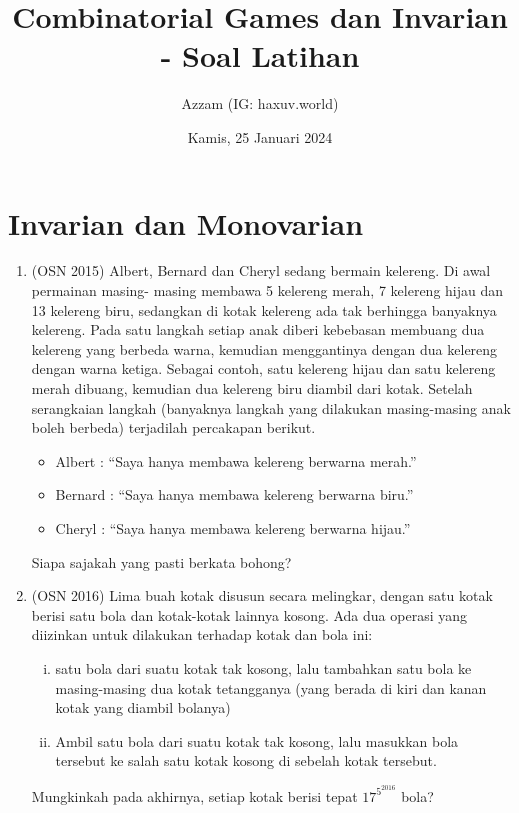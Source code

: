 \documentclass[12pt]{scrartcl}
\title{Combinatorial Games dan Invarian - Soal Latihan}
\author{Azzam (IG: haxuv.world)}
\date{Kamis, 25 Januari 2024}
\begin{document}
\maketitle

\renewcommand*\contentsname{Daftar Isi}
\tableofcontents

\newpage
\section{Invarian dan Monovarian}
\begin{enumerate}
\item (OSN 2015) Albert, Bernard dan Cheryl sedang bermain kelereng. Di awal permainan masing- masing membawa 5 kelereng merah, 7 kelereng hijau dan 13 kelereng biru, sedangkan di kotak kelereng ada tak berhingga banyaknya kelereng. Pada satu langkah setiap anak diberi kebebasan membuang dua kelereng yang berbeda warna, kemudian menggantinya dengan dua kelereng dengan warna ketiga. Sebagai contoh, satu kelereng hijau dan satu kelereng merah dibuang, kemudian dua kelereng biru diambil dari kotak. Setelah serangkaian langkah (banyaknya langkah yang dilakukan masing-masing anak boleh berbeda) terjadilah percakapan berikut.
    \begin{itemize}
        \item Albert : “Saya hanya membawa kelereng berwarna merah.”
        \item Bernard : “Saya hanya membawa kelereng berwarna biru.”
        \item Cheryl : “Saya hanya membawa kelereng berwarna hijau.”
    \end{itemize}
    Siapa sajakah yang pasti berkata bohong?

\item (OSN 2016) Lima buah kotak disusun secara melingkar, dengan satu kotak berisi satu bola dan kotak-kotak lainnya kosong. Ada dua operasi yang diizinkan untuk dilakukan terhadap kotak dan bola ini:
    \begin{enumerate}[(i)]
        \item  satu bola dari suatu kotak tak kosong, lalu tambahkan satu bola ke masing-masing dua kotak tetangganya (yang berada di kiri dan kanan kotak yang diambil bolanya)
        \item Ambil satu bola dari suatu kotak tak kosong, lalu masukkan bola tersebut ke salah satu kotak kosong di sebelah kotak tersebut.
    \end{enumerate}
    Mungkinkah pada akhirnya, setiap kotak berisi tepat $17^{5^{2016}}$ bola?


\end{enumerate}
\end{document}
